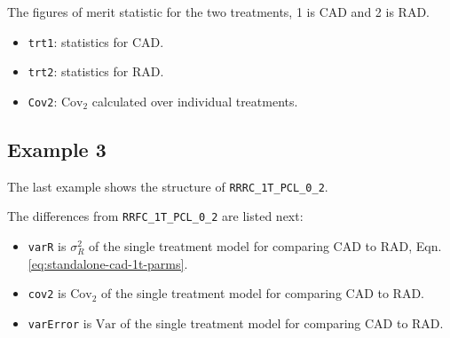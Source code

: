 \documentclass[
]{book}
\newenvironment{Shaded}{\begin{snugshade}}{\end{snugshade}}
\newcommand{\CommentTok}[1]{\textcolor[rgb]{0.56,0.35,0.01}{\textit{#1}}}
\newcommand{\DecValTok}[1]{\textcolor[rgb]{0.00,0.00,0.81}{#1}}
\newcommand{\NormalTok}[1]{#1}
\providecommand{\tightlist}{%
  \setlength{\itemsep}{0pt}\setlength{\parskip}{0pt}}
\begin{document}
The figures of merit statistic for the two treatments, 1 is CAD and 2 is RAD.

\begin{itemize}
\tightlist
\item
  \texttt{trt1}: statistics for CAD.
\item
  \texttt{trt2}: statistics for RAD.
\item
  \texttt{Cov2}: \(\text{Cov}_2\) calculated over individual treatments.
\end{itemize}

\hypertarget{example-3}{%
\subsection{Example 3}\label{example-3}}

The last example shows the structure of \texttt{RRRC\_1T\_PCL\_0\_2}.

\begin{Shaded}
\end{Shaded}

The differences from \texttt{RRFC\_1T\_PCL\_0\_2} are listed next:

\begin{itemize}
\tightlist
\item
  \texttt{varR} is \(\sigma_R^2\) of the single treatment model for comparing CAD to RAD, Eqn. \eqref{eq:standalone-cad-1t-parms}.
\item
  \texttt{cov2} is \(\text{Cov}_2\) of the single treatment model for comparing CAD to RAD.
\item
  \texttt{varError} is \(\text{Var}\) of the single treatment model for comparing CAD to RAD.
\end{itemize}
\end{document}
